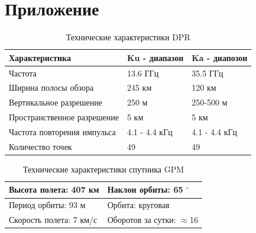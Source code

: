 \newpage
{}
\section*{Приложение}

\begin{table}[h!]
  \centering
  \caption{Технические характеристики DPR}
  \vspace{10 pt}
  \begin{tabular}{l|l|l}
   Характеристика & Ku - диапазон & Ka - диапозон \\ \hline
   Частота & 13.6 ГГц & 35.5 ГГц \\ \hline
   Ширина полосы обзора & 245 км & 120 км \\\hline
   Вертикальное разрешение & 250 м & 250-500 м \\\hline
   Пространственное разрешение & 5 км & 5 км \\\hline
   Частота повторения импульса & 4.1 - 4.4 кГц & 4.1 - 4.4 кГц \\\hline
   Количество точек & 49 & 49 
   \end{tabular}
  
  \label{tab:1}
\end{table}

\begin{table}[h!]
  \centering
  \caption{Технические характеристики спутника GPM}
  \vspace{10 pt}
  \begin{tabular}{l|l}
   Высота полета: 407 км & Наклон орбиты: 65 $^{\circ}$\\ \hline
     Период орбиты: 93 м & Орбита: круговая \\ \hline
     Скорость полета: 7 км/с & Оборотов за сутки: $\approx$16
  \end{tabular}
  
  \label{tab:1}
\end{table}

